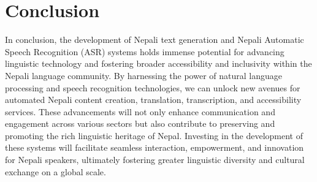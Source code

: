 \chapter[Conclusion]{Conclusion}

In conclusion, the development of Nepali text generation and Nepali Automatic Speech Recognition (ASR) systems holds immense potential for advancing linguistic technology and fostering broader accessibility and inclusivity within the Nepali language community. By harnessing the power of natural language processing and speech recognition technologies, we can unlock new avenues for automated Nepali content creation, translation, transcription, and accessibility services. These advancements will not only enhance communication and engagement across various sectors but also contribute to preserving and promoting the rich linguistic heritage of Nepal. Investing in the development of these systems will facilitate seamless interaction, empowerment, and innovation for Nepali speakers, ultimately fostering greater linguistic diversity and cultural exchange on a global scale.




